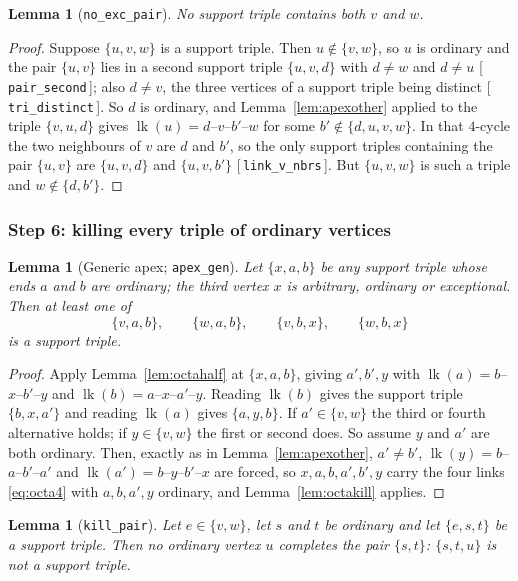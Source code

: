 \documentclass[11pt,reqno]{amsart}
\newcommand{\leanref}[1]{\textup{[\,\texttt{#1}\,]}}
\theoremstyle{plain}
\newtheorem{lemma}[theorem]{Lemma}
\theoremstyle{definition}
\numberwithin{theorem}{section}
\newcommand{\lk}{\operatorname{lk}}
\begin{document}
\begin{lemma}[\texttt{no\_exc\_pair}]\label{lem:noexcpair}
No support triple contains both $v$ and $w$.
\end{lemma}

\begin{proof}
Suppose $\{u,v,w\}$ is a support triple. Then $u \notin \{v,w\}$, so $u$ is ordinary and the
pair $\{u,v\}$ lies in a second support triple $\{u,v,d\}$ with $d \ne w$ and $d \ne u$
\leanref{pair\_second}; also $d \ne v$, the three vertices of a support triple being distinct
\leanref{tri\_distinct}. So $d$ is ordinary, and Lemma~\ref{lem:apexother} applied to the triple
$\{v,u,d\}$ gives $\lk(u) = d$--$v$--$b'$--$w$ for some $b' \notin \{d,u,v,w\}$. In that
$4$-cycle the two neighbours of $v$ are $d$ and $b'$, so the only support triples containing the
pair $\{u,v\}$ are $\{u,v,d\}$ and $\{u,v,b'\}$ \leanref{link\_v\_nbrs}. But $\{u,v,w\}$ is such
a triple and $w \notin \{d,b'\}$.
\end{proof}

\subsubsection*{Step 6: killing every triple of ordinary vertices}

\begin{lemma}[Generic apex; \texttt{apex\_gen}]\label{lem:apexgen}
Let $\{x,a,b\}$ be any support triple whose ends $a$ and $b$ are ordinary; the third vertex $x$
is arbitrary, ordinary or exceptional. Then at least one of
\[
  \{v,a,b\}, \qquad \{w,a,b\}, \qquad \{v,b,x\}, \qquad \{w,b,x\}
\]
is a support triple.
\end{lemma}

\begin{proof}
Apply Lemma~\ref{lem:octahalf} at $\{x,a,b\}$, giving $a', b', y$ with
$\lk(a) = b$--$x$--$b'$--$y$ and $\lk(b) = a$--$x$--$a'$--$y$. Reading $\lk(b)$ gives the
support triple $\{b,x,a'\}$ and reading $\lk(a)$ gives $\{a,y,b\}$. If $a' \in \{v,w\}$ the
third or fourth alternative holds; if $y \in \{v,w\}$ the first or second does. So assume $y$
and $a'$ are both ordinary. Then, exactly as in Lemma~\ref{lem:apexother}, $a' \ne b'$,
$\lk(y) = b$--$a$--$b'$--$a'$ and $\lk(a') = b$--$y$--$b'$--$x$ are forced, so
$x, a, b, a', b', y$ carry the four links \eqref{eq:octa4} with $a, b, a', y$ ordinary, and
Lemma~\ref{lem:octakill} applies.
\end{proof}

\begin{lemma}[\texttt{kill\_pair}]\label{lem:killpair}
Let $e \in \{v,w\}$, let $s$ and $t$ be ordinary and let $\{e,s,t\}$ be a support triple. Then
no ordinary vertex $u$ completes the pair $\{s,t\}$: $\{s,t,u\}$ is not a support triple.
\end{lemma}
\end{document}
